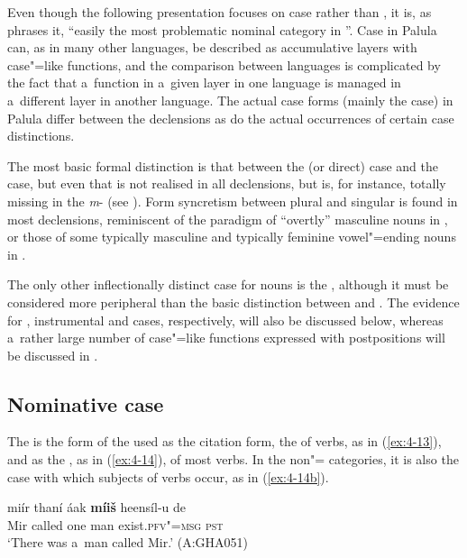 Even though the following presentation focuses on case  rather than , it is, as \citet[230--231]{masica1991} phrases it, ``easily the most problematic nominal category in \iliNIA''. Case in Palula can, as in many other \iliNIA languages, be described as accumulative  layers with case"=like functions, and the comparison between languages is complicated by the fact that a~function in a~given layer in one language is managed in a~different layer in another language. The actual case forms (mainly the  case) in Palula differ between the declensions as do the actual occurrences of certain case distinctions. 


The most basic formal distinction is that between the  (or direct) case and the  case, but even that is not realised in all declensions, but is, for instance, totally missing in the \textit{m}- (see ). Form syncretism \citep[27]{matthews1991} between  plural and  singular is found in most declensions, reminiscent of the paradigm of ``overtly'' masculine nouns in \iliUrduHindi \citep[1]{schmidt1999}, or those of some typically masculine and typically feminine vowel"=ending nouns in \iliPashto \citep[726-728]{robsontegey2009}.


The only other inflectionally distinct case for nouns is the , although it must be considered more peripheral than the basic distinction between  and . The evidence for , instrumental and  cases, respectively, will also be discussed below, whereas a~rather large number of case"=like functions expressed with postpositions will be discussed in .


\subsection{Nominative case}
\label{subsec:4-5-1}

The  is the form of the  used as the citation form, the  of  verbs, as in (\ref{ex:4-13}), and as the , as in (\ref{ex:4-14}), of most  verbs. In the non"= categories, it is also the case with which subjects of  verbs occur, as in (\ref{ex:4-14b}). 


\begin{exe}
\ex
\label{ex:4-13}
\gll miír thaní áak \textbf{míiš} heensíl-u de\\
	Mir called one man exist.\textsc{pfv"=msg} \textsc{pst}\\
\glt `There was a~man called Mir.' (A:GHA051)
\end{exe}

